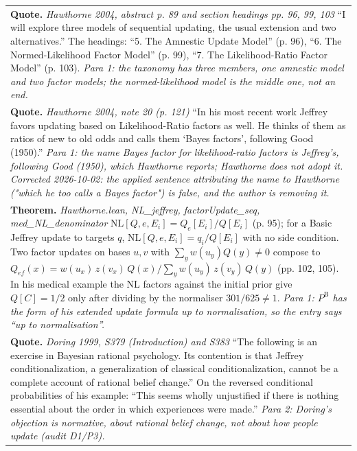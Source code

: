 \documentclass[10pt]{article}
\theoremstyle{definition}
\newcommand{\PB}{P^{\mathrm{B}}}
\newlength{\fullw}\setlength{\fullw}{25.9cm}
\begin{document}
{\begin{longtable}{|p{0.9cm}|p{12.2cm}|p{12.2cm}|}
\multicolumn{3}{|p{\fullw}|}{\textbf{Quote.} \textit{Hawthorne 2004, abstract p. 89 and section headings pp. 96, 99, 103} \newline ``I will explore three models of sequential updating, the usual extension and two alternatives.'' The headings: ``5. The Amnestic Update Model'' (p. 96), ``6. The Normed-Likelihood Factor Model'' (p. 99), ``7. The Likelihood-Ratio Factor Model'' (p. 103). \newline \textit{Para 1: the taxonomy has three members, one amnestic model and two factor models; the normed-likelihood model is the middle one, not an end.}} \\
\multicolumn{3}{|p{\fullw}|}{\textbf{Quote.} \textit{Hawthorne 2004, note 20 (p. 121)} \newline ``In his most recent work Jeffrey favors updating based on Likelihood-Ratio factors as well. He thinks of them as ratios of new to old odds and calls them `Bayes factors', following Good (1950).'' \newline \textit{Para 1: the name Bayes factor for likelihood-ratio factors is Jeffrey's, following Good (1950), which Hawthorne reports; Hawthorne does not adopt it. Corrected 2026-10-02: the applied sentence attributing the name to Hawthorne ("which he too calls a Bayes factor") is false, and the author is removing it.}} \\
\multicolumn{3}{|p{\fullw}|}{\textbf{Theorem.} \textit{Hawthorne.lean, NL\_jeffrey, factorUpdate\_seq, med\_NL\_denominator} \newline $\mathrm{NL}[Q,e,E_i] = Q_e[E_i]/Q[E_i]$ (p. 95); for a Basic Jeffrey update to targets $q$, $\mathrm{NL}[Q,e,E_i] = q_i/Q[E_i]$ with no side condition. Two factor updates on bases $u,v$ with $\sum_y w(u_y)Q(y) \neq 0$ compose to $Q_{ef}(x) = w(u_x)\,z(v_x)\,Q(x)\big/\sum_y w(u_y)\,z(v_y)\,Q(y)$ (pp. 102, 105). In his medical example the NL factors against the initial prior give $Q[C] = 1/2$ only after dividing by the normaliser $301/625 \neq 1$. \newline \textit{Para 1: $\PB$ has the form of his extended update formula up to normalisation, so the entry says ``up to normalisation''.}} \\
\multicolumn{3}{|p{\fullw}|}{\textbf{Quote.} \textit{Doring 1999, S379 (Introduction) and S383} \newline ``The following is an exercise in Bayesian rational psychology. Its contention is that Jeffrey conditionalization, a generalization of classical conditionalization, cannot be a complete account of rational belief change.'' On the reversed conditional probabilities of his example: ``This seems wholly unjustified if there is nothing essential about the order in which experiences were made.'' \newline \textit{Para 2: Doring's objection is normative, about rational belief change, not about how people update (audit D1/P3).}} \\

\end{longtable}}
\end{document}
